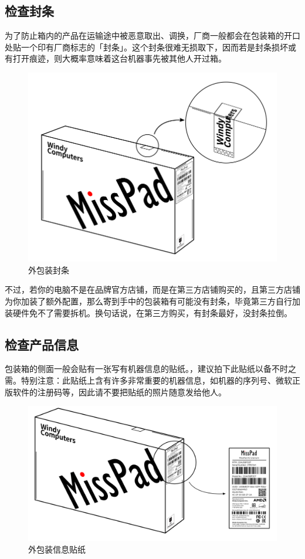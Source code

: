 \subsection{检查封条}

为了防止箱内的产品在运输途中被恶意取出、调换，厂商一般都会在包装箱的开口处贴一个印有厂商标志的「封条」。这个封条很难无损取下，因而若是封条损坏或有打开痕迹，则大概率意味着这台机器事先被其他人开过箱。

\begin{figure}[htb!]
  \centering
  \includegraphics[width=.6\textwidth]{assets/appendix/Checking_label.png}
  \caption{外包装封条}
  \label{fig:Checking_label}
\end{figure}

不过，若你的电脑不是在品牌官方店铺，而是在第三方店铺购买的，且第三方店铺为你加装了额外配置，那么寄到手中的包装箱有可能没有封条，毕竟第三方自行加装硬件免不了需要拆机。换句话说，在第三方购买，有封条最好，没封条拉倒。

\subsection{检查产品信息}

包装箱的侧面一般会贴有一张写有机器信息的贴纸。，建议拍下此贴纸以备不时之需。特别注意：此贴纸上含有许多非常重要的机器信息，如机器的序列号、微软正版软件的注册码等，因此请不要把贴纸的照片随意发给他人。

\begin{figure}[htb!]
  \centering
  \includegraphics[width=.6\textwidth]{assets/appendix/Checking_info.png}
  \caption{外包装信息贴纸}
  \label{fig:Checking_info}
\end{figure}

